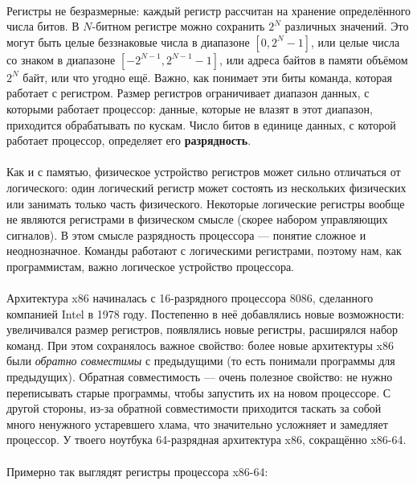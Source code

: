 \documentclass[11pt]{book}
\begin{document}
\bigskip
\\
Регистры не безразмерные: каждый регистр рассчитан на хранение определённого числа битов.
В $N$-битном регистре можно сохранить $2^N$ различных значений.
Это могут быть целые беззнаковые числа в диапазоне $[0, 2^N - 1]$,
или целые числа со знаком в диапазоне $[-2^{N-1}, 2^{N-1} - 1]$,
или адреса байтов в памяти объёмом $2^N$ байт,
или что угодно ещё.
Важно, как понимает эти биты команда, которая работает с регистром.
Размер регистров ограничивает диапазон данных, с которыми работает процессор: данные, которые не влазят в этот диапазон, приходится обрабатывать по кускам.
Число битов в единице данных, с которой работает процессор, определяет его \textbf{разрядность}.
\\ \\
Как и с памятью, физическое устройство регистров может сильно отличаться от логического:
один логический регистр может состоять из нескольких физических или занимать только часть физического.
Некоторые логические регистры вообще не являются регистрами в физическом смысле (скорее набором управляющих сигналов).
В этом смысле разрядность процессора --- понятие сложное и неоднозначное.
Команды работают с логическими регистрами, поэтому нам, как программистам, важно логическое устройство процессора.
\\ \\
Архитектура x86 начиналась с 16-разрядного процессора 8086, сделанного компанией Intel в 1978 году.
Постепенно в неё добавлялись новые возможности: увеличивался размер регистров, появлялись новые регистры, расширялся набор команд.
При этом сохранялось важное свойство: более новые архитектуры x86 были \emph{обратно совместимы} с предыдущими (то есть понимали программы для предыдущих).
Обратная совместимость --- очень полезное свойство: не нужно переписывать старые программы, чтобы запустить их на новом процессоре.
С другой стороны, из-за обратной совместимости приходится таскать за собой много ненужного устаревшего хлама,
что значительно усложняет и замедляет процессор.
У твоего ноутбука 64-разрядная архитектура x86, сокращённо x86-64.
\\ \\
Примерно так выглядят регистры процессора x86-64:
\\
\end{document}
